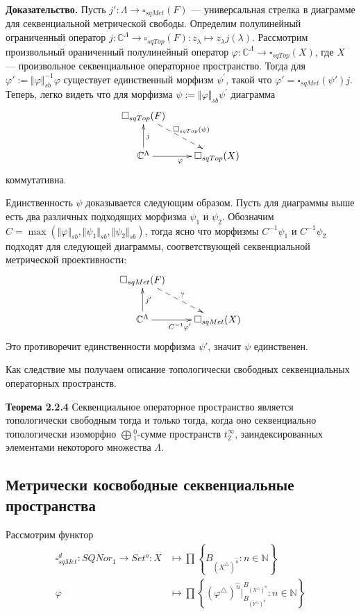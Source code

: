 \documentclass[12pt]{article}
\begin{document}
{\bf Доказательство.} Пусть $j':\Lambda\to \square_{sqMet}(F)$ --- универсальная стрелка в диаграмме для секвенциальной метрической свободы. Определим полулинейный ограниченный оператор $j: \mathbb{C}^{\Lambda} \to \square_{sqTop}(F): z_\lambda\mapsto z_\lambda j(\lambda)$. Рассмотрим произвольный ораниченный полулинейный оператор $\varphi : \mathbb{C}^{\Lambda} \to \square_{sqTop}(X)$, где $X$ --- произвольное секвенциальное операторное пространство.  Тогда для $\varphi':=\Vert \varphi \Vert_{sb}^{-1}\varphi $ существует единственный морфизм $\psi^{'}$, такой что $\varphi'=\square_{sqMet}(\psi')j$. Теперь, легко видеть что для морфизма $\psi:=\Vert \varphi \Vert_{sb} \psi^{'}$ диаграмма
$$
\xymatrix{
{\square_{sqTop}(F)}\ar@{-->}[dr]^{\square_{sqTop}(\psi)} & \\
{\mathbb{C}^{\Lambda}}\ar[u]_{j}\ar[r]_{\varphi}  &{\square_{sqTop}(X)} }
$$
коммутативна.
	
Единственность $\psi$ доказывается следующим образом. Пусть для диаграммы выше есть два различных подходящих морфизма $\psi_1$ и $\psi_2$. Обозначим $C=\max( \Vert \varphi\Vert_{sb}, \Vert \psi_1 \Vert_{sb}, \Vert \psi_2\Vert_{sb})$, тогда ясно что морфизмы $C^{-1}\psi_1$ и $C^{-1}\psi_2$ подходят для следующей диаграммы, соответствующей секвенциальной метрической проективности:
$$
\xymatrix{
{\square_{sqMet}(F)}\ar@{-->}[dr]^{?} & \\
{\mathbb{C}^\Lambda}\ar[u]_{j'}\ar[r]_{ C^{-1}\varphi'}  &{\square_{sqMet}(X)} }
$$
Это противоречит единственности морфизма $\psi'$, значит $\psi$ единственен.

\medskip

Как следствие мы получаем описание топологически свободных секвенциальных операторных пространств.

{\bf Теорема 2.2.4} Секвенциальное операторное пространство является топологически свободным тогда и только тогда, когда оно секвенциально топологически изоморфно $\bigoplus{}_1^0$-сумме пространств $t_2^\infty$, заиндексированных 
элементами некоторого множества $\Lambda$.


\subsection{Метрически косвободные секвенциальные пространства}

Рассмотрим функтор 
$$
\begin{aligned}
\square_{sqMet}^d : SQNor_1 \to Set^o: X &\mapsto \prod \left\{B_{(X^\triangle )^{\wideparen{n}}}:n\in\mathbb{N}\right\}\\
\varphi&\mapsto\prod\left\{ (\varphi^\triangle )^{\wideparen{n}}|_{B_{(Y^\triangle )^{\wideparen{n}}}}^{B_{(X^\triangle )^{\wideparen{n}}}}:n\in\mathbb{N}\right\}\\
\end{aligned}
$$
\end{document}
